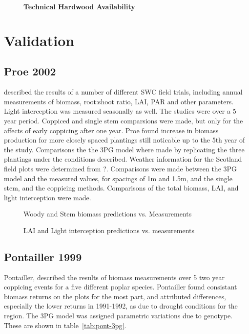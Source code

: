 \documentclass[10pt]{article}
\begin{document}
\begin{figure}[!ht]
\begin{center}
\end{center}
\caption{ {\bf Technical Hardwood Availability}  }
\label{fig:tech-map}
\end{figure}

\section*{Validation}

\subsection*{Proe 2002}

\cite{Proe2002} described the results of a number of different SWC
field trials, including annual measurements of biomass, root:shoot
ratio, LAI, PAR and other parameters.  Light interception was measured
seasonally as well.  The studies were over a 5 year period. Coppiced
and single stem comparsions were made, but only for the affects of
early coppicing after one year.  Proe found increase in biomass
production for more closely spaced plantings still noticable up to the
5th year of the study.  Comparisons the the 3PG model where made by
replicating the three plantings under the conditions described.
Weather information for the Scotland field plots were determined from
?.  Comparisons were made between the 3PG model and the measured
values, for spacings of 1m and 1.5m, and the single stem, and the
coppicing methods.  Comparisons of the total biomass, LAI, and light
interception were made. 

\begin{figure}
  \centering
  
  \caption{Woody and Stem biomass predictions vs. Measurements}
  \label{fig:proe-wood}
\end{figure}

\begin{figure}[!ht]
  \centering
  
  \caption{LAI and Light interception predictions vs. measurements}
  \label{fig:proe-light}
\end{figure}

\subsection{Pontailler 1999}
\label{sec:pont}

Pontailler, \cite{pontailler99biomass-yield} described the results of
biomass measurements over 5 two year coppicing events for a five
different poplar species.  Pontailler found consistant biomass returns
on the plots for the most part, and attributed differences, especially
the lower returns in 1991-1992, as due to drought conditions for the
region.  The 3PG model was assigned parametric variations due to
genotype.  These are shown in table~\ref{tab:pont-3pg}.
\end{document}
